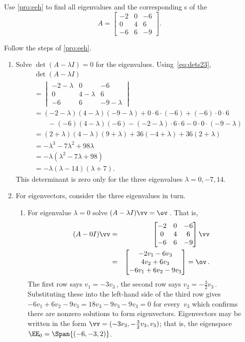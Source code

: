 \begin{example} \label{eg:3x3hande}
Use \cref{pro:eeh} to find all eigenvalues and the corresponding s of the 
\begin{equation*}
A=\begin{bmatrix} -2&0&-6\\0&4&6\\-6&6&-9 \end{bmatrix}.
\end{equation*}

\begin{solution} 
Follow the steps of \cref{pro:eeh}.
\begin{enumerate}
\item Solve \(\det(A-\lambda I)=0\) for the eigenvalues.
Using~\eqref{eq:dets23},
\begin{align*}&
\det(A-\lambda I)
\\&= \begin{vmatrix} -2-\lambda&0&-6\\0&4-\lambda&6\\-6&6&-9-\lambda \end{vmatrix}
\\&=(-2-\lambda)(4-\lambda)(-9-\lambda)+0\cdot6\cdot(-6)+(-6)\cdot0\cdot 6
\\&\qquad{}
-(-6)(4-\lambda)(-6)-(-2-\lambda)\cdot6\cdot6-0\cdot0\cdot(-9-\lambda)
\\&=(2+\lambda)(4-\lambda)(9+\lambda)+36(-4+\lambda)+36(2+\lambda)
\\&=-\lambda^3-7\lambda^2+98\lambda
\\&=-\lambda(\lambda^2-7\lambda+98)
\\&=-\lambda(\lambda-14)(\lambda+7).
\end{align*}
This determinant is zero only for the three eigenvalues \(\lambda=0,-7,14\).

\item For eigenvectors, consider the three eigenvalues in turn.
\begin{enumerate}
\item For eigenvalue \(\lambda=0\) solve \((A-\lambda I)\vv=\ov\)\,.  
That is,
\begin{eqnarray*}
(A-0I)\vv&=&\begin{bmatrix} -2&0&-6\\0&4&6\\-6&6&-9 \end{bmatrix}\vv
\\&=&\begin{bmatrix} -2v_1-6v_3\\4v_2+6v_3\\-6v_1+6v_2-9v_3 \end{bmatrix}=\ov\,.
\end{eqnarray*}
The first row says \(v_1=-3v_3\)\,, the second row says \(v_2=-\frac32v_3\)\,.  
Substituting these into the left-hand side of the third row gives
\(-6v_1+6v_2-9v_3=18v_3-9v_3-9v_3=0\) for every~\(v_3\) which confirms there are nonzero solutions to form eigenvectors.
Eigenvectors may be written in the form \(\vv=(-3v_3,-\frac32v_3,v_3)\); that is, the eigenspace \(\EE_0=\Span\{(-6,-3,2)\}\).


\end{enumerate}
\end{enumerate}
\end{solution}
\end{example}
